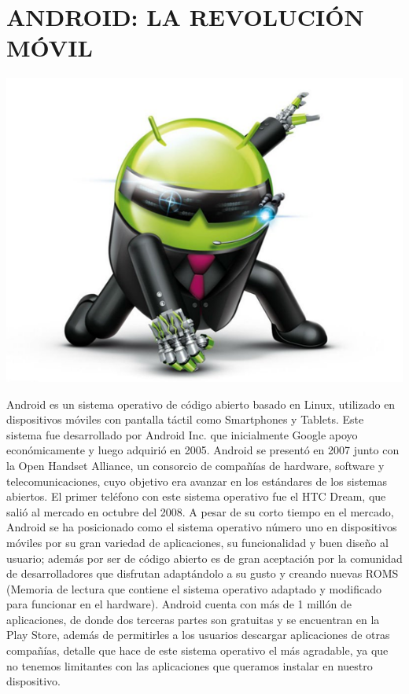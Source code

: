 \chapter*{ANDROID: LA REVOLUCIÓN MÓVIL}

\includegraphics[scale=0.7]{img/cp05/img0501.png}

Android es un sistema operativo de código abierto basado en Linux, utilizado en dispositivos móviles con pantalla táctil como Smartphones y Tablets. Este sistema fue desarrollado 
por Android Inc. que inicialmente Google apoyo económicamente y luego adquirió en 2005. Android se presentó en 2007 junto con la Open Handset Alliance, un consorcio de compañías 
de hardware, software y telecomunicaciones, cuyo objetivo era avanzar en los estándares de los sistemas abiertos. El primer teléfono con este sistema operativo fue el HTC Dream, 
que salió al mercado en octubre del 2008. A pesar de su corto tiempo en el mercado, Android se ha posicionado como el sistema operativo número uno en dispositivos móviles por su 
gran variedad de aplicaciones, su funcionalidad y buen diseño al usuario; además por ser de código abierto es de gran aceptación por la comunidad de desarrolladores que disfrutan 
adaptándolo a su gusto y creando nuevas ROMS (Memoria de lectura que contiene el sistema operativo adaptado y modificado para funcionar en el hardware). Android cuenta con más de 
1 millón de aplicaciones, de donde dos terceras partes son gratuitas y se encuentran en la Play Store, además de permitirles a los usuarios descargar aplicaciones de otras 
compañías, detalle que hace de este sistema operativo el más agradable, ya que no tenemos limitantes con las aplicaciones que queramos instalar en nuestro dispositivo.


